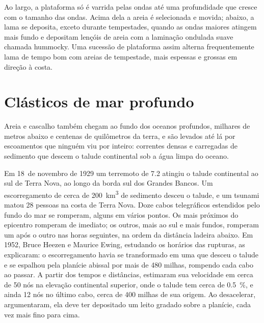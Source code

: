 Ao largo, a plataforma só é varrida pelas ondas até uma profundidade que cresce com o tamanho das ondas. Acima dela a areia é selecionada e movida; abaixo, a lama se deposita, exceto durante tempestades, quando as ondas maiores atingem mais fundo e depositam lençóis de areia com a laminação ondulada suave chamada  hummocky. Uma sucessão de plataforma assim alterna frequentemente lama de tempo bom com areias de tempestade, mais espessas e grossas em direção à costa.

\section{Clásticos de mar profundo}\label{sec:b1:clastic-sediments:deep-sea}

Areia e cascalho também chegam ao fundo dos oceanos profundos, milhares de metros abaixo e centenas de quilômetros da terra, e são levados até lá por escoamentos que ninguém viu por inteiro: correntes densas e carregadas de sedimento que descem o talude continental sob a água limpa do oceano.

\begin{history}
Em 18~de novembro de 1929 um terremoto de  7.2 atingiu o talude continental ao sul de Terra Nova, ao longo da borda sul dos Grandes Bancos. Um escorregamento de cerca de \qty{200}{km^3} de sedimento desceu o talude, e um tsunami matou 28 pessoas na costa de Terra Nova. Doze cabos telegráficos estendidos pelo fundo do mar se romperam, alguns em vários pontos. Os mais próximos do epicentro romperam de imediato; os outros, mais ao sul e mais fundos, romperam um após o outro nas horas seguintes, na ordem da distância ladeira abaixo. Em 1952, Bruce Heezen e Maurice Ewing, estudando os horários das rupturas, as explicaram: o escorregamento havia se transformado em uma
 que desceu o talude e se espalhou pela planície abissal por mais de 480 milhas, rompendo cada cabo ao passar. A partir dos tempos e distâncias, estimaram sua velocidade em cerca de 50 nós na elevação continental superior, onde o talude tem cerca de \qty{0.5}{\percent}, e ainda 12 nós no último cabo, cerca de 400 milhas de sua origem. Ao desacelerar, argumentaram, ela deve ter depositado um leito gradado sobre a planície, cada vez mais fino para cima.
\end{history}


